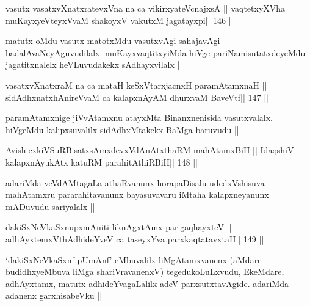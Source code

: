 
\begin{shl}
vasutx vasatxvXnatxratevxVna na ca vikirxyateV\s cnajxsA ||
vaqtetxyXVha muKayxyeVteyxVvaM shakoyxV vakutxM jagatayxpi\hfill || 146 ||
\end{shl}

\begin{artha}
matutx oMdu vasutx matotxMdu vasutxvAgi sahajavAgi 
badalAvaNeyAguvudilalx. muKayxvaqtitxyiMda hiVge pariNamisutatxdeyeMdu
jagatitxnalelx heVLuvudakekx sAdhayxvilalx ||
\end{artha}

\begin{shl}
vasatxvXnatxraM na ca mataH keSxVtarxjacnxH paramAtamxnaH ||
sidAdhxnatxhAnireVvaM ca kalapxnAyAM dhurxvaM BaveVtf\hfill || 147 ||
\end{shl}

\begin{artha}
paramAtamxnige jiVvAtamxnu atayxMta Binanxnenisida vasutxvalalx. hiVgeMdu
kalipxsuvalilx sidAdhxMtakekx BaMga baruvudu ||
\end{artha}


\begin{shl}
AvishicxkiVSuRBisatxsAmxdevxVdAnAtxthaRM mahAtamxBiH ||
IdaqshiV kalapxnA\s yukAtx katuRM parahitAthiRBiH\hfill || 148 ||
\end{shl}

\begin{artha}
adariMda veVdAMtagaLa athaRvanunx horapaDisalu udedxVshisuva
mahAtamxru pararahitavanunx bayasuvavaru iMtaha kalapxneyanunx
mADuvudu sariyalalx ||
\end{artha}


\begin{shl}
dakiSxNeV\s kaSxnupxmAniti liknAgxtAmx parigaqhayxteV ||
adhAyxtemxV\s thAdhideYveV ca taseyxYva parxkaqtatavxtaH\hfill || 149 ||
\end{shl}

\begin{artha}
`dakiSxNeV\s kaSxnf pUmAnf' eMbuvalilx liMgAtamxvanenx (aMdare
  budidhxyeMbuva liMga shariVravanenxV) tegedukoLuLxvudu, EkeMdare,
  adhAyxtamx, matutx adhideYvagaLalilx adeV parxsutxtavAgide. adariMda
  adanenx garxhisabeVku ||
\end{artha}

